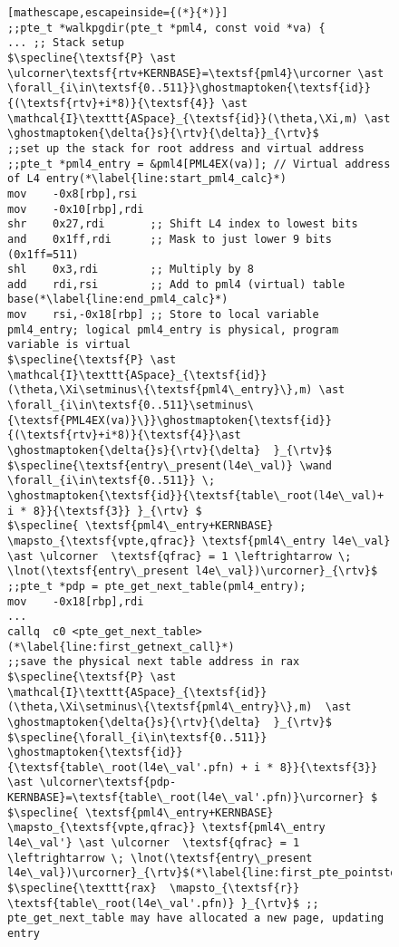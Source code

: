 \begin{figure}\footnotesize
\begin{lstlisting}[mathescape,escapeinside={(*}{*)}]
;;pte_t *walkpgdir(pte_t *pml4, const void *va) {
... ;; Stack setup
$\specline{\textsf{P} \ast \ulcorner\textsf{rtv+KERNBASE}=\textsf{pml4}\urcorner \ast \forall_{i\in\textsf{0..511}}\ghostmaptoken{\textsf{id}}{(\textsf{rtv}+i*8)}{\textsf{4}} \ast \mathcal{I}\texttt{ASpace}_{\textsf{id}}(\theta,\Xi,m) \ast \ghostmaptoken{\delta{}s}{\rtv}{\delta}}_{\rtv}$
;;set up the stack for root address and virtual address    
;;pte_t *pml4_entry = &pml4[PML4EX(va)]; // Virtual address of L4 entry(*\label{line:start_pml4_calc}*)
mov    -0x8[rbp],rsi
mov    -0x10[rbp],rdi
shr    0x27,rdi       ;; Shift L4 index to lowest bits
and    0x1ff,rdi      ;; Mask to just lower 9 bits (0x1ff=511)
shl    0x3,rdi        ;; Multiply by 8
add    rdi,rsi        ;; Add to pml4 (virtual) table base(*\label{line:end_pml4_calc}*)
mov    rsi,-0x18[rbp] ;; Store to local variable pml4_entry; logical pml4_entry is physical, program variable is virtual
$\specline{\textsf{P} \ast \mathcal{I}\texttt{ASpace}_{\textsf{id}}(\theta,\Xi\setminus\{\textsf{pml4\_entry}\},m) \ast \forall_{i\in\textsf{0..511}\setminus\{\textsf{PML4EX(va)}\}}\ghostmaptoken{\textsf{id}}{(\textsf{rtv}+i*8)}{\textsf{4}}\ast \ghostmaptoken{\delta{}s}{\rtv}{\delta}  }_{\rtv}$
$\specline{\textsf{entry\_present(l4e\_val)} \wand \forall_{i\in\textsf{0..511}} \; \ghostmaptoken{\textsf{id}}{\textsf{table\_root(l4e\_val)+ i * 8}}{\textsf{3}} }_{\rtv} $
$\specline{ \textsf{pml4\_entry+KERNBASE} \mapsto_{\textsf{vpte,qfrac}} \textsf{pml4\_entry l4e\_val} \ast \ulcorner  \textsf{qfrac} = 1 \leftrightarrow \; \lnot(\textsf{entry\_present l4e\_val})\urcorner}_{\rtv}$    
;;pte_t *pdp = pte_get_next_table(pml4_entry);
mov    -0x18[rbp],rdi
...
callq  c0 <pte_get_next_table>(*\label{line:first_getnext_call}*)
;;save the physical next table address in rax
$\specline{\textsf{P} \ast \mathcal{I}\texttt{ASpace}_{\textsf{id}}(\theta,\Xi\setminus\{\textsf{pml4\_entry}\},m)  \ast \ghostmaptoken{\delta{}s}{\rtv}{\delta}  }_{\rtv}$
$\specline{\forall_{i\in\textsf{0..511}} \ghostmaptoken{\textsf{id}}{\textsf{table\_root(l4e\_val'.pfn) + i * 8}}{\textsf{3}}  \ast \ulcorner\textsf{pdp-KERNBASE}=\textsf{table\_root(l4e\_val'.pfn)}\urcorner} $
$\specline{ \textsf{pml4\_entry+KERNBASE} \mapsto_{\textsf{vpte,qfrac}} \textsf{pml4\_entry l4e\_val'} \ast \ulcorner  \textsf{qfrac} = 1 \leftrightarrow \; \lnot(\textsf{entry\_present l4e\_val})\urcorner}_{\rtv}$(*\label{line:first_pte_pointsto}*)
$\specline{\texttt{rax}  \mapsto_{\textsf{r}} \textsf{table\_root(l4e\_val'.pfn)} }_{\rtv}$ ;; pte_get_next_table may have allocated a new page, updating entry

\end{lstlisting}
\end{figure}
